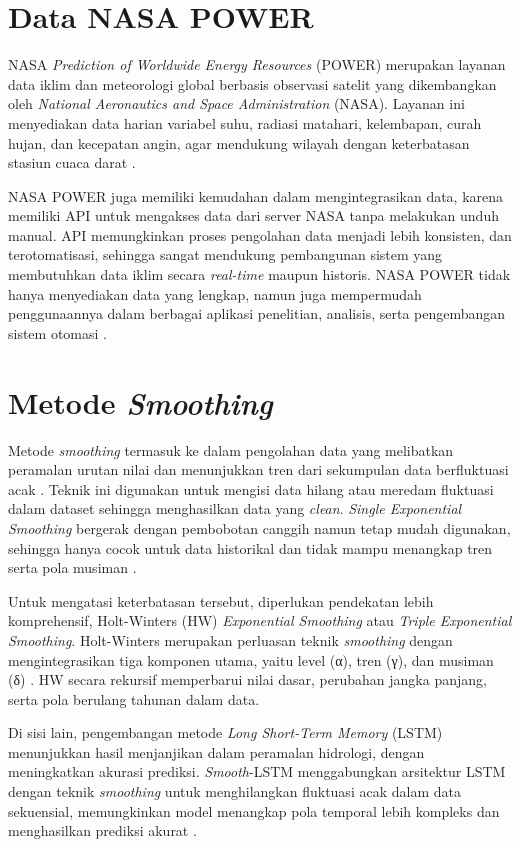 \section{Data NASA POWER}
NASA \textit{Prediction of Worldwide Energy Resources} (POWER) merupakan layanan data iklim dan meteorologi global berbasis observasi satelit yang dikembangkan oleh \textit{National Aeronautics and Space Administration} (NASA). Layanan ini menyediakan data harian variabel suhu, radiasi matahari, kelembapan, curah hujan, dan kecepatan angin, agar mendukung wilayah dengan keterbatasan stasiun cuaca darat \parencite{rodrigues2021}.

NASA POWER juga memiliki kemudahan dalam mengintegrasikan data, karena memiliki API untuk mengakses data dari server NASA tanpa melakukan unduh manual. API memungkinkan proses pengolahan data menjadi lebih konsisten, dan terotomatisasi, sehingga sangat mendukung pembangunan sistem yang membutuhkan data iklim secara \textit{real-time} maupun historis. NASA POWER tidak hanya menyediakan data yang lengkap, namun juga mempermudah penggunaannya dalam berbagai aplikasi penelitian, analisis, serta pengembangan sistem otomasi \parencite{sparks2018}.

\section{Metode \textit{Smoothing}}
Metode \textit{smoothing} termasuk ke dalam pengolahan data yang melibatkan peramalan urutan nilai dan menunjukkan tren dari sekumpulan data berfluktuasi acak \parencite{castillo2022}. Teknik ini digunakan untuk mengisi data hilang atau meredam fluktuasi dalam dataset sehingga menghasilkan data yang \textit{clean}. \textit{Single Exponential Smoothing} bergerak dengan pembobotan canggih namun tetap mudah digunakan, sehingga hanya cocok untuk data historikal dan tidak mampu menangkap tren serta pola musiman \parencite{susanto2017}.

Untuk mengatasi keterbatasan tersebut, diperlukan pendekatan lebih komprehensif, Holt-Winters (HW) \textit{Exponential Smoothing} atau \textit{Triple Exponential Smoothing}. Holt-Winters merupakan perluasan teknik \textit{smoothing} dengan mengintegrasikan tiga komponen utama, yaitu level (α), tren (γ), dan musiman (δ) \parencite{trull2020}. HW secara rekursif memperbarui nilai dasar, perubahan jangka panjang, serta pola berulang tahunan dalam data.

Di sisi lain, pengembangan metode \textit{Long Short-Term Memory} (LSTM) menunjukkan hasil menjanjikan dalam peramalan hidrologi, dengan meningkatkan akurasi prediksi. \textit{Smooth}-LSTM menggabungkan arsitektur LSTM dengan teknik \textit{smoothing} untuk menghilangkan fluktuasi acak dalam data sekuensial, memungkinkan model menangkap pola temporal lebih kompleks dan menghasilkan prediksi akurat \parencite{khatun2023}.

